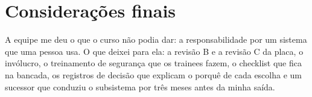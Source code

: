 \documentclass[final,exemplo]{nro-aacc}
\begin{document}
\section{Considerações finais}
A equipe me deu o que o curso não podia dar: a responsabilidade por um sistema que uma pessoa usa. O
que deixei para ela: a revisão B e a revisão C da placa, o invólucro, o treinamento de segurança que os
trainees fazem, o checklist que fica na bancada, os registros de decisão que explicam o porquê de cada
escolha e um sucessor que conduziu o subsistema por três meses antes da minha saída.


\pareceres

\anexoevidencias
{}
\end{document}
